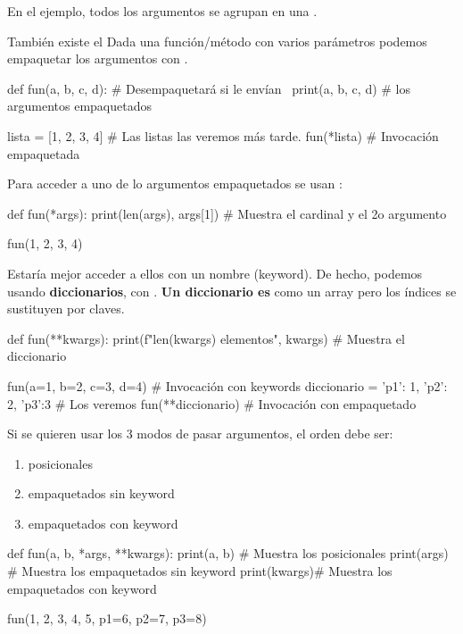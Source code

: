 En el ejemplo, todos los argumentos se agrupan en una .

También existe el  Dada una función/método con varios parámetros podemos empaquetar los argumentos con \key{*}.

\hfil
\begin{pyconsole}[][frame=single]
def fun(a, b, c, d):   # Desempaquetará si le envían \
    print(a, b, c, d)  # los argumentos empaquetados

lista = [1, 2, 3, 4] # Las listas las veremos más tarde.
fun(*lista)          # Invocación empaquetada
\end{pyconsole}



Para acceder a uno de lo argumentos empaquetados se usan :

\begin{pyconsole}[][frame=single, fontsize=\footnotesize]
def fun(*args): 
    print(len(args), args[1]) # Muestra el cardinal y el 2o argumento

fun(1, 2, 3, 4)
\end{pyconsole}


Estaría mejor acceder a ellos con un nombre (keyword). De hecho,
podemos \key{empaquetar y usar keywords} usando \textbf{diccionarios}, con \cm{**}. \textbf{Un diccionario es} como un array pero los índices se sustituyen por claves.

\begin{pyconsole}[][frame=single, fontsize=\footnotesize]
def fun(**kwargs): 
    print(f"{len(kwargs)} elementos", kwargs) # Muestra el diccionario

fun(a=1, b=2, c=3, d=4)    # Invocación con keywords
diccionario = {'p1': 1, 'p2': 2, 'p3':3}  # Los veremos
fun(**diccionario)         # Invocación con empaquetado
\end{pyconsole}




\noindent Si se quieren usar los 3 modos de pasar argumentos, el orden debe ser:
\begin{enumerate}
\item posicionales 
\item empaquetados sin keyword
\item empaquetados con keyword
\end{enumerate} 



\begin{pyconsole}[][frame=single, fontsize=\footnotesize]
def fun(a, b, *args, **kwargs): 
    print(a, b)  # Muestra los posicionales
    print(args)  # Muestra los empaquetados sin keyword
    print(kwargs)# Muestra los empaquetados con keyword

fun(1, 2, 3, 4, 5, p1=6, p2=7, p3=8)
\end{pyconsole}


